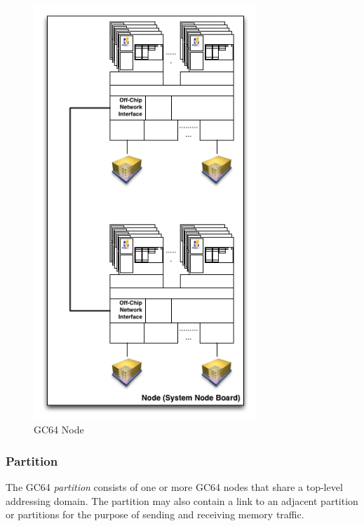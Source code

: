 \documentclass{article}
\begin{document}
\begin{figure}[h!]
\begin{center}
\includegraphics[width=0.75\textwidth]{gc64-node.png}
\caption{GC64 Node}
\end{center}
\label{figure:node}
\end{figure}  


\newpage
\subsubsection{Partition}

The GC64 \emph{partition} consists of one or more GC64 nodes that share a top-level addressing domain.  The partition may also contain a link to an adjacent partition or partitions for the purpose of sending and receiving memory traffic.  
\end{document}
